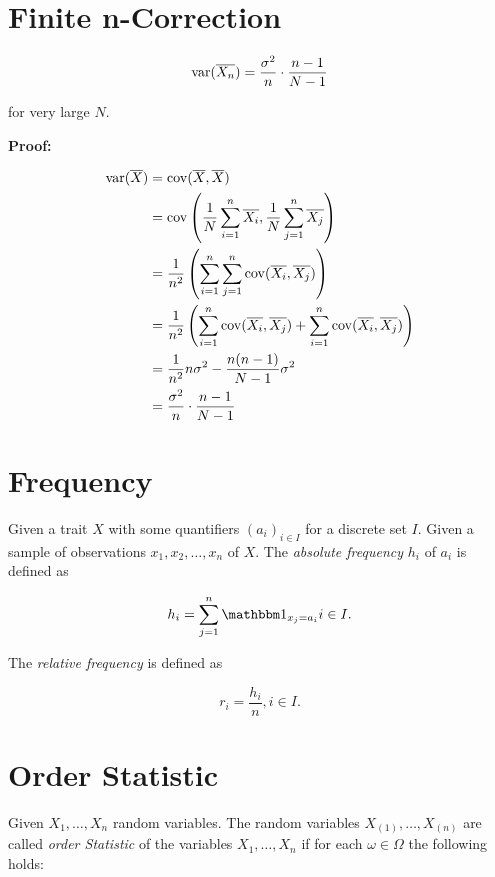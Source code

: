 \section{Finite n-Correction}

\[
    \mathrm{var}(\overline{X_n}) = \frac{\sigma^2}{n} \cdot \frac{n - 1}{N - 1}
\]

for very large \(N\).

\textbf{Proof:}

\begin{align*}
    \mathrm{var}(\overline{X}) &= \mathrm{cov}(\overline{X}, \overline{X}) \\
   &= \mathrm{cov} \left(\frac{1}{N} \sum_{i = 1}^{n} \overline{X_i}, \frac{1}{N} \sum_{j = 1}^{n} \overline{X_j} \right) \\ 
   &= \frac{1}{n^2} \left(\sum_{i = 1}^{n}\sum_{j = 1}^{n} \mathrm{cov}(\overline{X_i}, \overline{X_j}) \right) \\ 
   &= \frac{1}{n^2} \left(\sum_{i = 1}^{n} \mathrm{cov}(\overline{X_i}, \overline{X_j}) + \sum_{i = 1}^{n} \mathrm{cov}(\overline{X_i}, \overline{X_j})\right) \\ 
   &= \frac{1}{n^2} n\sigma^2 - \frac{n(n - 1)}{N - 1}\sigma^2 \\ 
   &= \frac{\sigma^2}{n} \cdot \frac{n - 1}{N - 1}
\end{align*}

\QED 

\section{Frequency}

Given a trait \(X\) with some quantifiers \((a_i)_{i \in I}\) for a discrete set \(I\). Given a 
sample of observations \(x_1, x_2, \dots, x_n\) of \(X\). The \emph{absolute frequency} \(h_i\) of \(a_i\) is 
defined as 

\[
    h_i = \sum_{j = 1}^{n} \ind_{x_j = a_i} i \in I.
\]

The \emph{relative frequency} is defined as  

\[
    r_i = \frac{h_i}{n}, i \in I.
\]

\section{Order Statistic}

Given \(X_1, \dots, X_n\) random variables. The random variables \(X_{(1)}, \dots, X_{(n)}\) are 
called \emph{order Statistic} of the variables \(X_1, \dots, X_n\) if for each \(\omega \in \Omega\) the following holds: 

